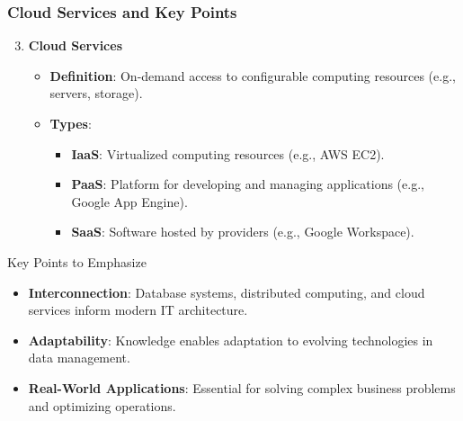 \documentclass[aspectratio=169]{beamer}
\begin{document}
\begin{frame}[fragile]
    \frametitle{Cloud Services and Key Points}
    \begin{enumerate}
        \setcounter{enumi}{2}
        \item \textbf{Cloud Services}
        \begin{itemize}
            \item \textbf{Definition}: On-demand access to configurable computing resources (e.g., servers, storage).
            \item \textbf{Types}:
            \begin{itemize}
                \item \textbf{IaaS}: Virtualized computing resources (e.g., AWS EC2).
                \item \textbf{PaaS}: Platform for developing and managing applications (e.g., Google App Engine).
                \item \textbf{SaaS}: Software hosted by providers (e.g., Google Workspace).
            \end{itemize}
        \end{itemize}
    \end{enumerate}

    \begin{block}{Key Points to Emphasize}
        \begin{itemize}
            \item \textbf{Interconnection}: Database systems, distributed computing, and cloud services inform modern IT architecture.
            \item \textbf{Adaptability}: Knowledge enables adaptation to evolving technologies in data management.
            \item \textbf{Real-World Applications}: Essential for solving complex business problems and optimizing operations.
        \end{itemize}
    \end{block}
\end{frame}
\end{document}
